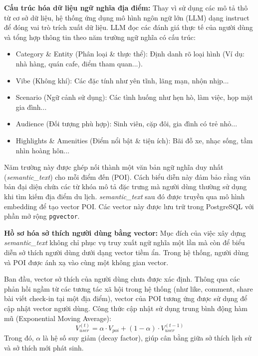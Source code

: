 
\textbf{Cấu trúc hóa dữ liệu ngữ nghĩa địa điểm:}
Thay vì sử dụng các mô tả thô từ cơ sở dữ liệu, hệ thống ứng dụng mô hình ngôn ngữ lớn (LLM) dạng instruct để đóng vai trò trích xuất dữ liệu. LLM đọc các đánh giá thực tế của người dùng và tổng hợp thông tin theo năm trường ngữ nghĩa có cấu trúc:
\begin{itemize}
    \item Category \& Entity (Phân loại \& thực thể): Định danh rõ loại hình (Ví dụ: nhà hàng, quán cafe, điểm tham quan...).
    \item Vibe (Không khí): Các đặc tính như yên tĩnh, lãng mạn, nhộn nhịp...
    \item Scenario (Ngữ cảnh sử dụng): Các tình huống như hẹn hò, làm việc, họp mặt gia đình...
    \item Audience (Đối tượng phù hợp): Sinh viên, cặp đôi, gia đình có trẻ nhỏ...
    \item Highlights \& Amenities (Điểm nổi bật \& tiện ích): Bãi đỗ xe, nhạc sống, tầm nhìn hoàng hôn...
\end{itemize}
Năm trường này được ghép nối thành một văn bản ngữ nghĩa duy nhất (\textit{semantic\_text}) cho mỗi điểm đến (POI). Cách biểu diễn này đảm bảo rằng văn bản đại diện chứa các từ khóa mô tả đặc trưng mà người dùng thường sử dụng khi tìm kiếm địa điểm du lịch. \textit{semantic\_text} sau đó được truyền qua mô hình embedding để tạo vector POI. Các vector này được lưu trữ trong PostgreSQL với phần mở rộng \texttt{pgvector}.

\textbf{Hồ sơ hóa sở thích người dùng bằng vector:}
Mục đích của việc xây dựng \textit{semantic\_text} không chỉ phục vụ truy xuất ngữ nghĩa một lần mà còn để biểu diễn sở thích người dùng dưới dạng vector tiềm ẩn. Trong hệ thống, người dùng và POI được ánh xạ vào cùng một không gian vector. 

Ban đầu, vector sở thích của người dùng chưa được xác định. Thông qua các phản hồi ngầm từ các tương tác xã hội trong hệ thống (như like, comment, share bài viết check-in tại một địa điểm), vector của POI tương ứng được sử dụng để cập nhật vector người dùng. Công thức cập nhật sử dụng trung bình động hàm mũ (Exponential Moving Average):
\begin{equation}
    V_{user}^{(t)} = \alpha \cdot V_{poi} + (1 - \alpha) \cdot V_{user}^{(t-1)}
\end{equation}
Trong đó, $\alpha$ là hệ số suy giảm (decay factor), giúp cân bằng giữa sở thích lịch sử và sở thích mới phát sinh.

